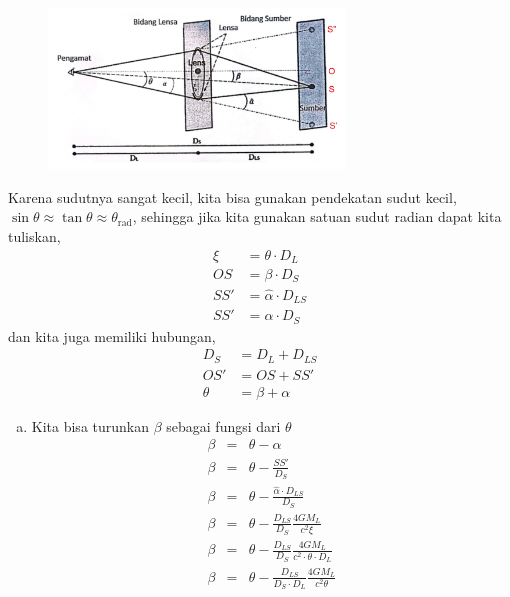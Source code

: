 \documentclass[11pt,fleqn]{exam}
\begin{document}
\begin{questions}
\begin{figure}[!ht]
    \centering
    \includegraphics[width=0.7\textwidth]{lensing2.jpg}
\end{figure}

Karena sudutnya sangat kecil, kita bisa gunakan pendekatan sudut kecil, $\sin{\theta} \approx \tan{\theta} \approx \theta_\text{rad}$, sehingga jika kita gunakan satuan sudut radian dapat kita tuliskan,
\begin{align*}
    \xi &= \theta \cdot D_L\\
    OS &= \beta \cdot D_{S}\\
    SS' &= \widehat{\alpha} \cdot D_{LS}\\
    SS' &= \alpha \cdot D_S
\end{align*}
dan kita juga memiliki hubungan,
\begin{align*}
    D_S &= D_L + D_{LS}\\
    OS' &= OS + SS'\\
    \theta &= \beta + \alpha
\end{align*}

\begin{enumerate}[a.]
    \item Kita bisa turunkan $\beta$ sebagai fungsi dari $\theta$
    \begin{eqnarray*}
        \beta &=& \theta - \alpha\\
        \beta &=& \theta - \frac{SS'}{D_S}\\
        \beta &=& \theta - \frac{\widehat{\alpha} \cdot D_{LS}}{D_S}\\
        \beta &=& \theta - \frac{D_{LS}}{D_S} \frac{4GM_L}{c^2 \xi}\\
        \beta &=& \theta - \frac{D_{LS}}{D_S} \frac{4GM_L}{c^2 \cdot \theta \cdot D_L}\\
        \beta &=& \theta - \frac{D_{LS}}{D_S \cdot D_L} \frac{4GM_L}{c^2 \theta}
    \end{eqnarray*}


\end{enumerate}
\end{questions}
\end{document}
